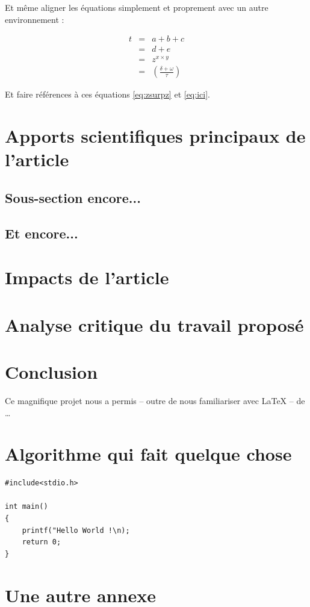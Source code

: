 \documentclass[a4paper, 12pt]{article}
\begin{document}
Et même aligner les équations simplement et proprement avec un autre environnement :

\begin{eqnarray}
t &=& a+b+c\\
&=& d+e \\
&=& z^{x\times y}\label{eq:ici}\\
&=& \left(\frac{\delta + \omega}{\tau}\right)
\end{eqnarray}

Et faire références à ces équations \eqref{eq:zsurpz} et \eqref{eq:ici}.

\clearpage 
\section{Apports scientifiques principaux de l’article}
\subsection{Sous-section encore...}
\subsection{Et encore...}


\clearpage 
\section{Impacts de l'article}

\clearpage 
\section{Analyse critique du travail proposé}

\clearpage 
\section*{Conclusion}

Ce magnifique projet nous a permis -- outre de nous familiariser avec \LaTeX{} -- de \ldots

\clearpage 




\clearpage 
\appendix
\bigskip{}
\section{Algorithme qui fait quelque chose}
\begin{verbatim}
#include<stdio.h>

int main()
{
	printf("Hello World !\n);
	return 0;
}
\end{verbatim}

\clearpage 
\section{Une autre annexe}
\end{document}
